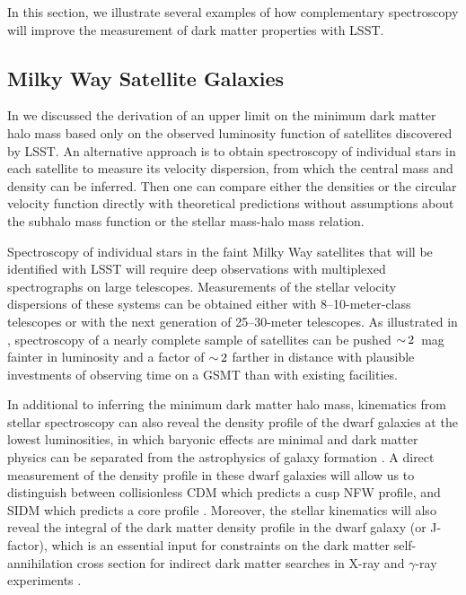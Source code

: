 In this section, we illustrate several examples of how complementary spectroscopy will improve the measurement of dark matter properties with LSST.

\subsection{Milky Way Satellite Galaxies }
In  we discussed the derivation of an upper limit on the minimum dark matter halo mass based only on the observed luminosity function of satellites discovered by LSST.   An alternative approach is to obtain spectroscopy of individual stars in each satellite to measure its velocity dispersion, from which the central mass and density can be inferred.  Then one can compare either the densities or the circular velocity function directly with theoretical predictions without assumptions about the subhalo mass function or the stellar mass-halo mass relation.

Spectroscopy of individual stars in the faint Milky Way satellites that will be identified with LSST will require deep observations with multiplexed spectrographs on large telescopes.  Measurements of the stellar velocity dispersions of these systems can be obtained either with 8--10-meter-class telescopes or with the next generation of 25--30-meter telescopes.  As illustrated in , spectroscopy of a nearly complete sample of satellites can be pushed $ {\sim}\, 2$~mag fainter in luminosity and a factor of $ {\sim}\, 2$ farther in distance with plausible investments of observing time on a GSMT than with existing facilities.

In additional to inferring the minimum dark matter halo mass, kinematics from stellar spectroscopy can also reveal the density profile of the dwarf galaxies at the lowest luminosities, in which baryonic effects are minimal and dark matter physics can be separated from the astrophysics of galaxy formation \citep{governato2012,read2017}.  A direct measurement of the density profile in these dwarf galaxies will allow us to distinguish between collisionless CDM  which predicts a cusp NFW profile, and SIDM which predicts a core profile \citep{Rocha:2012jg,2012MNRAS.423.3740V}. Moreover, the stellar kinematics will also reveal the integral of the dark matter density profile in the dwarf galaxy (or J-factor), which is an essential input for constraints on the dark matter self-annihilation cross section for indirect dark matter searches in X-ray and $\gamma$-ray experiments \citep[\eg,][]{1108.3546}.

